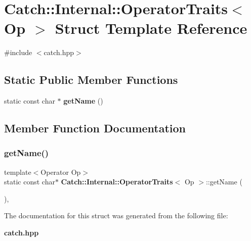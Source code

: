 \section{Catch\+:\+:Internal\+:\+:Operator\+Traits$<$ Op $>$ Struct Template Reference}
\label{struct_catch_1_1_internal_1_1_operator_traits}


{\ttfamily \#include $<$catch.\+hpp$>$}

\subsection*{Static Public Member Functions}
\begin{DoxyCompactItemize}
\item 
static const char $\ast$ \textbf{ get\+Name} ()
\end{DoxyCompactItemize}


\subsection{Member Function Documentation}
\mbox{\label{struct_catch_1_1_internal_1_1_operator_traits_ac6d08082ea33348d42bc4ccbd6d07671}} 
\subsubsection{get\+Name()}
{\footnotesize\ttfamily template$<$Operator Op$>$ \\
static const char$\ast$ \textbf{ Catch\+::\+Internal\+::\+Operator\+Traits}$<$ Op $>$\+::get\+Name (\begin{DoxyParamCaption}{ }\end{DoxyParamCaption})\hspace{0.3cm}{\ttfamily [inline]}, {\ttfamily [static]}}



The documentation for this struct was generated from the following file\+:\begin{DoxyCompactItemize}
\item 
\textbf{ catch.\+hpp}\end{DoxyCompactItemize}
